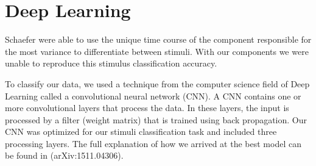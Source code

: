\chapter{Deep Learning}
Schaefer \etal \citeyear{schaefer_name_2011} were able to use the unique time course of the component responsible for the most variance to differentiate between stimuli.
With our components we were unable to reproduce this stimulus classification accuracy. 
 
To classify our data, we used a technique from the computer science field of Deep Learning called a convolutional neural network (\ac{CNN}).
A \ac{CNN} contains one or more convolutional layers that process the data.
In these layers, the input is processed by a filter (weight matrix) that is trained using back propagation. 
Our \ac{CNN} was optimized for our stimuli classification task and included three processing layers.
The full explanation of how we arrived at the best model can be found in \cite{stober_ICLR2016} (arXiv:1511.04306).

